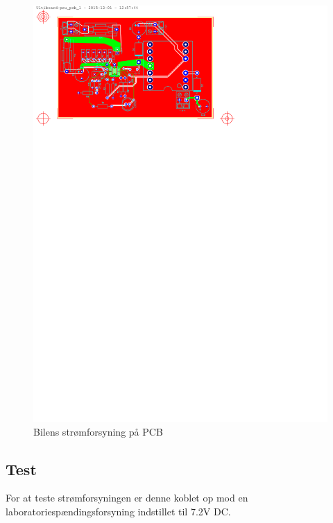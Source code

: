\begin{figure}[h]
\centering
\includegraphics[angle=90,height=\textheight-9cm, clip=true, trim=50 615 234 25]{../fig/diagrammer/bil/psu_pcb_twoside}
\caption{Bilens strømforsyning på PCB}
\label{fig:bil_psu_pcb}
\end{figure}

\clearpage

\subsection{Test}

For at teste strømforsyningen er denne koblet op mod en laboratoriespændingsforsyning indstillet til 7.2V DC.